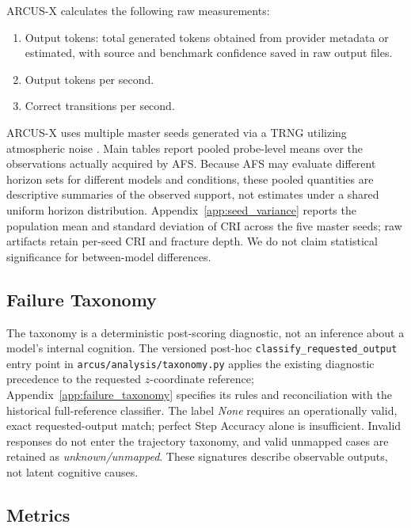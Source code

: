 \documentclass{article}
\begin{document}
ARCUS-X calculates the following raw measurements:
\begin{enumerate}
    \item Output tokens: total generated tokens obtained from provider metadata or estimated, with source and benchmark confidence saved in raw output files.
    \item Output tokens per second.
    \item Correct transitions per second.
\end{enumerate}

ARCUS-X uses multiple master seeds generated via a TRNG utilizing atmospheric noise \cite{haahr_random_org}. Main tables report pooled probe-level means over the observations actually acquired by AFS. Because AFS may evaluate different horizon sets for different models and conditions, these pooled quantities are descriptive summaries of the observed support, not estimates under a shared uniform horizon distribution. Appendix~\ref{app:seed_variance} reports the population mean and standard deviation of CRI across the five master seeds; raw artifacts retain per-seed CRI and fracture depth. We do not claim statistical significance for between-model differences.

\subsection{Failure Taxonomy}
\label{subsec:failure_taxonomy}
The taxonomy is a deterministic post-scoring diagnostic, not an inference about a model's internal cognition. The versioned post-hoc \texttt{classify\_requested\_output} entry point in \texttt{arcus/analysis/taxonomy.py} applies the existing diagnostic precedence to the requested $z$-coordinate reference; Appendix~\ref{app:failure_taxonomy} specifies its rules and reconciliation with the historical full-reference classifier. The label \emph{None} requires an operationally valid, exact requested-output match; perfect Step Accuracy alone is insufficient. Invalid responses do not enter the trajectory taxonomy, and valid unmapped cases are retained as \emph{unknown/unmapped}. These signatures describe observable outputs, not latent cognitive causes.

\subsection{Metrics}
\label{subsec:Metrics}
\end{document}

